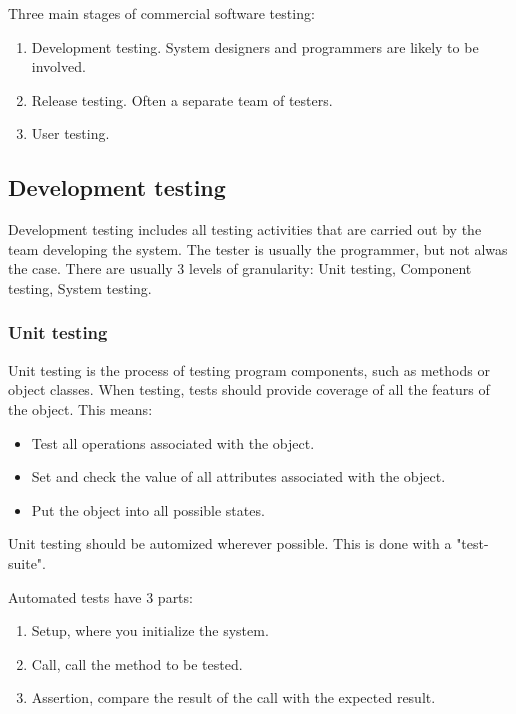 \documentclass{article}
\begin{document}
Three main stages of commercial software testing:
\begin{enumerate}
    \item Development testing.  System designers and programmers are likely to be involved.
    \item Release testing.  Often a separate team of testers.
    \item User testing.  
\end{enumerate}

\subsection{Development testing}
Development testing includes all testing activities that are carried out by the team developing the system.  The tester is usually the programmer, but not alwas the case.  There are usually 3 levels of granularity: Unit testing, Component testing, System testing.
\subsubsection{Unit testing}
Unit testing is the process of testing program components, such as methods or object classes.
When testing, tests should provide coverage of all the featurs of the object.  This means:
\begin{itemize}
    \item Test all operations associated with the object.
    \item Set and check the value of all attributes associated with the object.
    \item Put the object into all possible states.
\end{itemize}
Unit testing should be automized wherever possible.
This is done with a "test-suite".

Automated tests have 3 parts:
\begin{enumerate}
    \item Setup, where you initialize the system.
    \item Call, call the method to be tested.
    \item Assertion, compare the result of the call with the expected result.
\end{enumerate}
\end{document}
